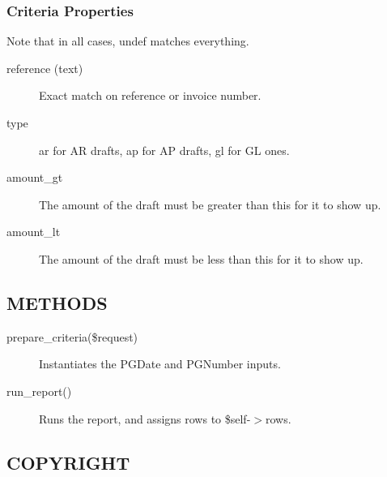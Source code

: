 \begin{description}
\begin{description}
\begin{description}
\begin{description}
\begin{description}
\begin{description}
\begin{description}
\begin{description}
\begin{description}
\begin{description}
\subsubsection*{Criteria Properties\label{LedgerSMB::DBObject::Report::Unapproved::Drafts_Criteria_Properties}}


Note that in all cases, undef matches everything.

\begin{description}

\item[{reference (text)}] \mbox{}

Exact match on reference or invoice number.


\item[{type}] \mbox{}

ar for AR drafts, ap for AP drafts, gl for GL ones.


\item[{amount\_gt}] \mbox{}

The amount of the draft must be greater than this for it to show up.


\item[{amount\_lt}] \mbox{}

The amount of the draft must be less than this for it to show up.

\end{description}
\subsection*{METHODS\label{LedgerSMB::DBObject::Report::Unapproved::Drafts_METHODS}}
\begin{description}

\item[{prepare\_criteria(\$request)}] \mbox{}

Instantiates the PGDate and PGNumber inputs.


\item[{run\_report()}] \mbox{}

Runs the report, and assigns rows to \$self-$>$rows.

\end{description}
\subsection*{COPYRIGHT\label{LedgerSMB::DBObject::Report::Unapproved::Drafts_COPYRIGHT}}



\end{description}
\end{description}
\end{description}
\end{description}
\end{description}
\end{description}
\end{description}
\end{description}
\end{description}
\end{description}
